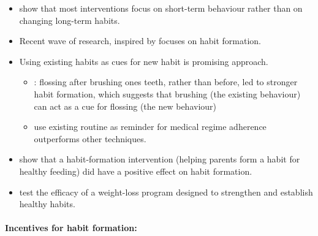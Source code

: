 \documentclass[a4paper, 11pt]{report}
\begin{document}
\begin{itemize}
	\item \citet{marteau2012changing} show that most interventions focus on short-term behaviour rather than on changing long-term habits.

	\item Recent wave of research, inspired by \citet{lally2010habits} focuses on habit formation.

	\item Using existing habits as cues for new habit is promising approach.
	\begin{itemize}
		\item \citet{judah2013forming}: flossing after brushing ones teeth, rather than before, led to stronger habit formation, which suggests that brushing (the existing behaviour) can act as a cue for flossing (the new behaviour)
		\item \citet{stawarz2014personalized} use existing routine as reminder for medical regime adherence outperforms other techniques.
	\end{itemize}

	\item \citet{mcgowan2013healthy} show that a habit-formation intervention (helping parents form a habit for healthy feeding) did have a positive effect on habit formation.

	\item \citet{carels2011transforming, carels2014randomized} test the efficacy of a weight-loss program designed to strengthen and establish healthy habits.
\end{itemize}


\paragraph{Incentives for habit formation:}
\end{document}
